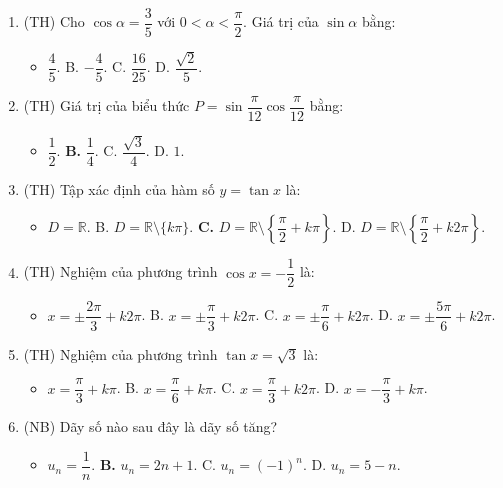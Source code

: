 \documentclass[12pt, a4paper]{article}
\begin{document}
\begin{enumerate}[leftmargin=0.6cm]
    \item (TH) Cho $\cos \alpha = \dfrac{3}{5}$ với $0 < \alpha < \dfrac{\pi}{2}$. Giá trị của $\sin \alpha$ bằng:
    \begin{itemize}[leftmargin=0.6cm]
        \item[\textbf{A.}] $\dfrac{4}{5}$. \quad B. $-\dfrac{4}{5}$. \quad C. $\dfrac{16}{25}$. \quad D. $\dfrac{\sqrt{2}}{5}$.
    \end{itemize}

    \item (TH) Giá trị của biểu thức $P = \sin\dfrac{\pi}{12}\cos\dfrac{\pi}{12}$ bằng:
    \begin{itemize}[leftmargin=0.6cm]
        \item[A.] $\dfrac{1}{2}$. \quad \textbf{B.} $\dfrac{1}{4}$. \quad C. $\dfrac{\sqrt{3}}{4}$. \quad D. $1$.
    \end{itemize}

    \item (TH) Tập xác định của hàm số $y = \tan x$ là:
    \begin{itemize}[leftmargin=0.6cm]
        \item[A.] $D = \mathbb{R}$. \quad B. $D = \mathbb{R} \setminus \{k\pi\}$. \quad \textbf{C.} $D = \mathbb{R} \setminus \left\{\dfrac{\pi}{2} + k\pi\right\}$. \quad D. $D = \mathbb{R} \setminus \left\{\dfrac{\pi}{2} + k2\pi\right\}$.
    \end{itemize}

    \item (TH) Nghiệm của phương trình $\cos x = -\dfrac{1}{2}$ là:
    \begin{itemize}[leftmargin=0.6cm]
        \item[\textbf{A.}] $x = \pm \dfrac{2\pi}{3} + k2\pi$. \quad B. $x = \pm \dfrac{\pi}{3} + k2\pi$. \quad C. $x = \pm \dfrac{\pi}{6} + k2\pi$. \quad D. $x = \pm \dfrac{5\pi}{6} + k2\pi$.
    \end{itemize}

    \item (TH) Nghiệm của phương trình $\tan x = \sqrt{3}$ là:
    \begin{itemize}[leftmargin=0.6cm]
        \item[\textbf{A.}] $x = \dfrac{\pi}{3} + k\pi$. \quad B. $x = \dfrac{\pi}{6} + k\pi$. \quad C. $x = \dfrac{\pi}{3} + k2\pi$. \quad D. $x = -\dfrac{\pi}{3} + k\pi$.
    \end{itemize}

    \item (NB) Dãy số nào sau đây là dãy số tăng?
    \begin{itemize}[leftmargin=0.6cm]
        \item[A.] $u_n = \dfrac{1}{n}$. \quad \textbf{B.} $u_n = 2n + 1$. \quad C. $u_n = (-1)^n$. \quad D. $u_n = 5 - n$.
    \end{itemize}


\end{enumerate}
\end{document}
